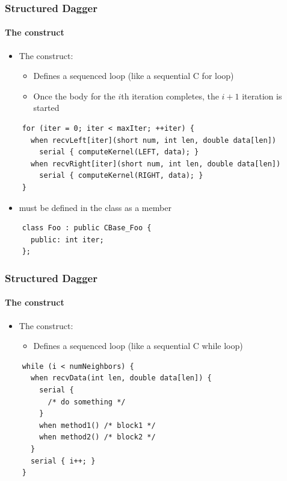 \documentclass{beamer}
\begin{document}
\begin{frame}[fragile]
  \frametitle{Structured Dagger}
  \framesubtitle{The  construct}
  \begin{itemize}
  \item The  construct:
    \begin{itemize}
    \item Defines a sequenced  loop (like a sequential C for loop)
    \item Once the body for the $i$th iteration completes, the $i+1$ iteration
      is started
    \end{itemize}
  \end{itemize}
  \begin{lstlisting}
    for (iter = 0; iter < maxIter; ++iter) {
      when recvLeft[iter](short num, int len, double data[len])
        serial { computeKernel(LEFT, data); }
      when recvRight[iter](short num, int len, double data[len])
        serial { computeKernel(RIGHT, data); }
    }
  \end{lstlisting}
  \begin{itemize}
  \item {} must be defined in the class as a member
  \end{itemize}
  \begin{lstlisting}
    class Foo : public CBase_Foo {
      public: int iter;
    };
  \end{lstlisting}
\end{frame}

\begin{frame}[fragile]
  \frametitle{Structured Dagger}
  \framesubtitle{The  construct}
  \begin{itemize}
  \item The  construct:
    \begin{itemize}
    \item Defines a sequenced  loop (like a sequential C while loop)
    \end{itemize}
  \end{itemize}
  \begin{lstlisting}
    while (i < numNeighbors) {
      when recvData(int len, double data[len]) {
        serial {
          /* do something */
        }
        when method1() /* block1 */
        when method2() /* block2 */
      }
      serial { i++; }
    }
  \end{lstlisting}
\end{frame}
\end{document}
